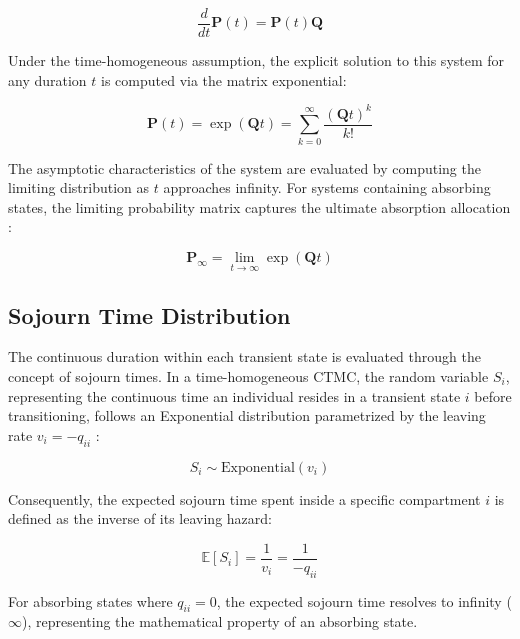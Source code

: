 \documentclass[9pt,a4paper,twocolumn,twoside]{rho-class/rho}
\begin{document}
        \begin{equation}
            \frac{d}{dt}\mathbf{P}(t) = \mathbf{P}(t)\mathbf{Q}
        \end{equation}
        
        Under the time-homogeneous assumption, the explicit solution to this system for any duration $t$ is computed via the matrix exponential:
        
        \begin{equation}
            \mathbf{P}(t) = \exp(\mathbf{Q}t) = \sum_{k=0}^{\infty} \frac{(\mathbf{Q}t)^k}{k!}
        \end{equation}
        
        The asymptotic characteristics of the system are evaluated by computing the limiting distribution as $t$ approaches infinity. For systems containing absorbing states, the limiting probability matrix captures the ultimate absorption allocation \cite{Norris1997}:

        \begin{equation}
            \mathbf{P}_{\infty} = \lim_{t \to \infty} \exp(\mathbf{Q}t)
        \end{equation}

    \subsection{Sojourn Time Distribution}
        The continuous duration within each transient state is evaluated through the concept of sojourn times. In a time-homogeneous CTMC, the random variable $S_i$, representing the continuous time an individual resides in a transient state $i$ before transitioning, follows an Exponential distribution parametrized by the leaving rate $v_i = -q_{ii}$ \cite{Norris1997}:

        \begin{equation}
            S_i \sim \text{Exponential}(v_i)
        \end{equation}

        Consequently, the expected sojourn time spent inside a specific compartment $i$ is defined as the inverse of its leaving hazard:

        \begin{equation}
            \mathbb{E}[S_i] = \frac{1}{v_i} = \frac{1}{-q_{ii}}
        \end{equation}

        For absorbing states where $q_{ii} = 0$, the expected sojourn time resolves to infinity ($\infty$), representing the mathematical property of an absorbing state.
\end{document}

